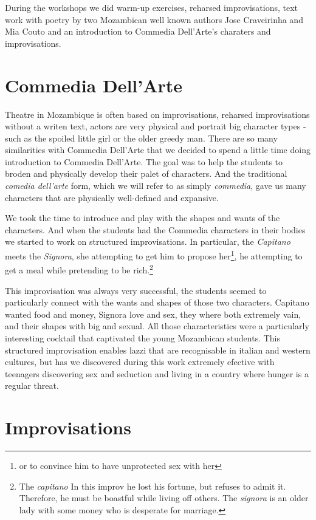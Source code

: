 \documentclass[article,twocolumn,twoside]{memoir}
\begin{document}
During the workshops we did warm-up exercises, reharsed improvisations, text
work with poetry by two Mozambican well known authors Jose Craveirinha and
Mia Couto and an introduction to Commedia Dell'Arte's charaters and
improvisations.

\section{Commedia Dell'Arte}

Theatre in Mozambique is often based on improvisations, reharsed improvisations
without a writen text, actors are very physical and portrait big character
types - such as the spoiled little girl or the older greedy man. There are so
many similarities with Commedia Dell'Arte that we decided to spend a little
time doing introduction to Commedia Dell'Arte. The goal was to help the
students to broden and physically develop their palet of characters. And the
traditional \textit{comedia dell'arte} form, which we will refer to as simply
\textit{commedia}, gave us many characters that are physically well-defined and
expansive.

We took the time to introduce and play with the shapes and wants of the
characters. And when the students had the Commedia characters in their bodies
we started to work on structured improvisations. In particular, the
\textit{Capitano} meets the \textit{Signora}, she attempting to get him to
propose her\footnote{or to convince him to have unprotected sex with her}, he
attempting to get a meal while pretending to be rich.\footnote{The
\textit{capitano} In this improv he lost his fortune, but refuses to admit it.
Therefore, he must be boastful while living off others. The \textit{signora} is
an older lady with some money who is desperate for marriage.}

This improvisation was always very successful, the students seemed to
particularly connect with the wants and shapes of those two characters.
Capitano wanted food and money, Signora love and sex, they where both extremely
vain, and their shapes with big and sexual. All those characteristics were a
particularly interesting cocktail that captivated the young Mozambican
students. This structured improvisation enables lazzi that are recognisable in
italian and western cultures, but has we discovered during this work extremely
efective with teenagers discovering sex and seduction and living in a country
where hunger is a regular threat.

\section{Improvisations}
\end{document}
